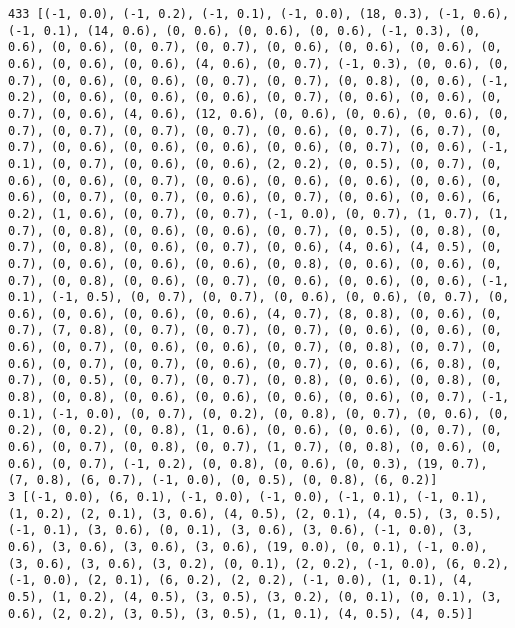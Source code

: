 \documentclass[11pt]{article}
\begin{document}
\begin{Verbatim}[commandchars=\\\{\}]
433 [(-1, 0.0), (-1, 0.2), (-1, 0.1), (-1, 0.0), (18, 0.3), (-1, 0.6), (-1, 0.1), (14, 0.6), (0, 0.6), (0, 0.6), (0, 0.6), (-1, 0.3), (0, 0.6), (0, 0.6), (0, 0.7), (0, 0.7), (0, 0.6), (0, 0.6), (0, 0.6), (0, 0.6), (0, 0.6), (0, 0.6), (4, 0.6), (0, 0.7), (-1, 0.3), (0, 0.6), (0, 0.7), (0, 0.6), (0, 0.6), (0, 0.7), (0, 0.7), (0, 0.8), (0, 0.6), (-1, 0.2), (0, 0.6), (0, 0.6), (0, 0.6), (0, 0.7), (0, 0.6), (0, 0.6), (0, 0.7), (0, 0.6), (4, 0.6), (12, 0.6), (0, 0.6), (0, 0.6), (0, 0.6), (0, 0.7), (0, 0.7), (0, 0.7), (0, 0.7), (0, 0.6), (0, 0.7), (6, 0.7), (0, 0.7), (0, 0.6), (0, 0.6), (0, 0.6), (0, 0.6), (0, 0.7), (0, 0.6), (-1, 0.1), (0, 0.7), (0, 0.6), (0, 0.6), (2, 0.2), (0, 0.5), (0, 0.7), (0, 0.6), (0, 0.6), (0, 0.7), (0, 0.6), (0, 0.6), (0, 0.6), (0, 0.6), (0, 0.6), (0, 0.7), (0, 0.7), (0, 0.6), (0, 0.7), (0, 0.6), (0, 0.6), (6, 0.2), (1, 0.6), (0, 0.7), (0, 0.7), (-1, 0.0), (0, 0.7), (1, 0.7), (1, 0.7), (0, 0.8), (0, 0.6), (0, 0.6), (0, 0.7), (0, 0.5), (0, 0.8), (0, 0.7), (0, 0.8), (0, 0.6), (0, 0.7), (0, 0.6), (4, 0.6), (4, 0.5), (0, 0.7), (0, 0.6), (0, 0.6), (0, 0.6), (0, 0.8), (0, 0.6), (0, 0.6), (0, 0.7), (0, 0.8), (0, 0.6), (0, 0.7), (0, 0.6), (0, 0.6), (0, 0.6), (-1, 0.1), (-1, 0.5), (0, 0.7), (0, 0.7), (0, 0.6), (0, 0.6), (0, 0.7), (0, 0.6), (0, 0.6), (0, 0.6), (0, 0.6), (4, 0.7), (8, 0.8), (0, 0.6), (0, 0.7), (7, 0.8), (0, 0.7), (0, 0.7), (0, 0.7), (0, 0.6), (0, 0.6), (0, 0.6), (0, 0.7), (0, 0.6), (0, 0.6), (0, 0.7), (0, 0.8), (0, 0.7), (0, 0.6), (0, 0.7), (0, 0.7), (0, 0.6), (0, 0.7), (0, 0.6), (6, 0.8), (0, 0.7), (0, 0.5), (0, 0.7), (0, 0.7), (0, 0.8), (0, 0.6), (0, 0.8), (0, 0.8), (0, 0.8), (0, 0.6), (0, 0.6), (0, 0.6), (0, 0.6), (0, 0.7), (-1, 0.1), (-1, 0.0), (0, 0.7), (0, 0.2), (0, 0.8), (0, 0.7), (0, 0.6), (0, 0.2), (0, 0.2), (0, 0.8), (1, 0.6), (0, 0.6), (0, 0.6), (0, 0.7), (0, 0.6), (0, 0.7), (0, 0.8), (0, 0.7), (1, 0.7), (0, 0.8), (0, 0.6), (0, 0.6), (0, 0.7), (-1, 0.2), (0, 0.8), (0, 0.6), (0, 0.3), (19, 0.7), (7, 0.8), (6, 0.7), (-1, 0.0), (0, 0.5), (0, 0.8), (6, 0.2)]
3 [(-1, 0.0), (6, 0.1), (-1, 0.0), (-1, 0.0), (-1, 0.1), (-1, 0.1), (1, 0.2), (2, 0.1), (3, 0.6), (4, 0.5), (2, 0.1), (4, 0.5), (3, 0.5), (-1, 0.1), (3, 0.6), (0, 0.1), (3, 0.6), (3, 0.6), (-1, 0.0), (3, 0.6), (3, 0.6), (3, 0.6), (3, 0.6), (19, 0.0), (0, 0.1), (-1, 0.0), (3, 0.6), (3, 0.6), (3, 0.2), (0, 0.1), (2, 0.2), (-1, 0.0), (6, 0.2), (-1, 0.0), (2, 0.1), (6, 0.2), (2, 0.2), (-1, 0.0), (1, 0.1), (4, 0.5), (1, 0.2), (4, 0.5), (3, 0.5), (3, 0.2), (0, 0.1), (0, 0.1), (3, 0.6), (2, 0.2), (3, 0.5), (3, 0.5), (1, 0.1), (4, 0.5), (4, 0.5)]

\end{Verbatim}
\end{document}
